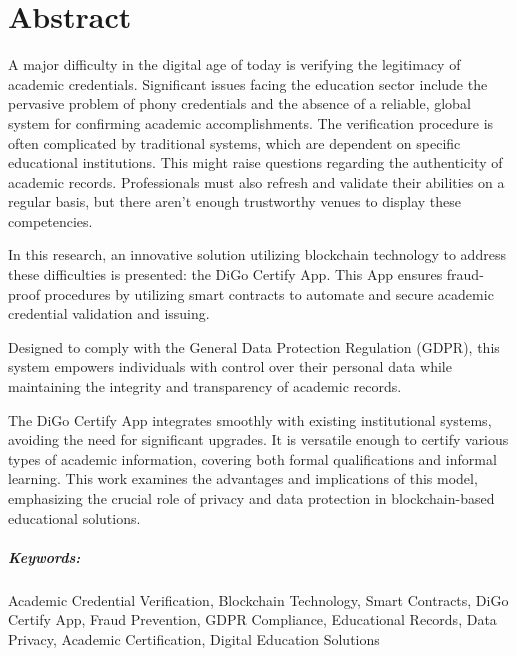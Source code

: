 %
% 
\chapter*{Abstract}\label{chap:abstract}

A major difficulty in the digital age of today is verifying the legitimacy of academic credentials. Significant issues facing the education sector include the pervasive problem of phony credentials and the absence of a reliable, global system for confirming academic accomplishments. The verification procedure is often complicated by traditional systems, which are dependent on specific educational institutions. This might raise questions regarding the authenticity of academic records. Professionals must also refresh and validate their abilities on a regular basis, but there aren't enough trustworthy venues to display these competencies.

In this research, an innovative solution utilizing blockchain technology to address these difficulties is presented: the DiGo Certify App. This App ensures fraud-proof procedures by utilizing smart contracts to automate and secure academic credential validation and issuing.

Designed to comply with the General Data Protection Regulation (GDPR), this system empowers individuals with control over their personal data while maintaining the integrity and transparency of academic records.

The DiGo Certify App integrates smoothly with existing institutional systems, avoiding the need for significant upgrades. It is versatile enough to certify various types of academic information, covering both formal qualifications and informal learning. This work examines the advantages and implications of this model, emphasizing the crucial role of privacy and data protection in blockchain-based educational solutions.

\paragraph{Keywords:} Academic Credential Verification, Blockchain Technology, Smart Contracts, DiGo Certify App, Fraud Prevention, GDPR Compliance, Educational Records, Data Privacy, Academic Certification, Digital Education Solutions